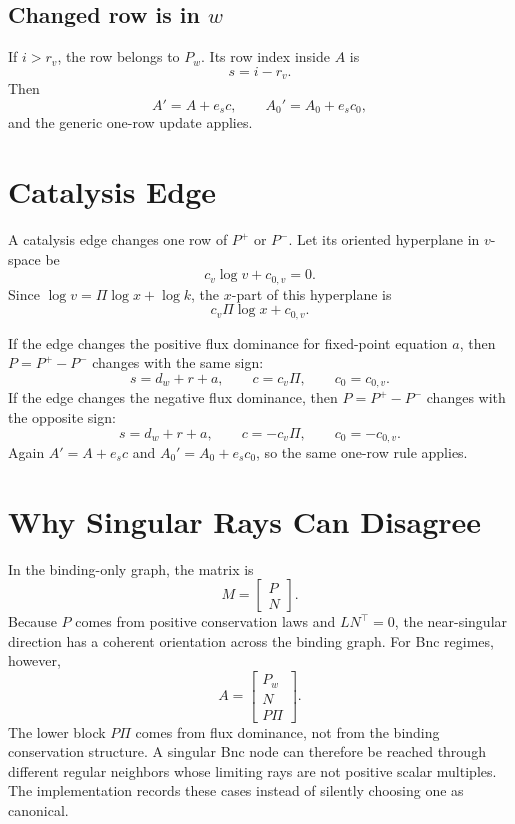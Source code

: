 \documentclass[11pt]{article}
\newcommand{\logx}{\log x}
\newcommand{\logv}{\log v}
\newcommand{\logk}{\log k}
\begin{document}
\subsection*{Changed row is in \(w\)}

If \(i>r_v\), the row belongs to \(P_w\).  Its row index inside \(A\) is
\[
    s=i-r_v .
\]
Then
\[
    A'=A+e_s c,
    \qquad
    A_0'=A_0+e_sc_0,
\]
and the generic one-row update applies.

\section{Catalysis Edge}

A catalysis edge changes one row of \(P^+\) or \(P^-\).  Let its oriented
hyperplane in \(v\)-space be
\[
    c_v\logv+c_{0,v}=0.
\]
Since \(\logv=\Pi\logx+\logk\), the \(x\)-part of this hyperplane is
\[
    c_v\Pi\logx+c_{0,v}.
\]

If the edge changes the positive flux dominance for fixed-point equation \(a\),
then \(P=P^+-P^-\) changes with the same sign:
\[
    s=d_w+r+a,
    \qquad
    c=c_v\Pi,
    \qquad
    c_0=c_{0,v}.
\]
If the edge changes the negative flux dominance, then \(P=P^+-P^-\) changes with
the opposite sign:
\[
    s=d_w+r+a,
    \qquad
    c=-c_v\Pi,
    \qquad
    c_0=-c_{0,v}.
\]
Again \(A'=A+e_sc\) and \(A_0'=A_0+e_sc_0\), so the same one-row rule applies.

\section{Why Singular Rays Can Disagree}

In the binding-only graph, the matrix is
\[
    M=\begin{bmatrix}P\\N\end{bmatrix}.
\]
Because \(P\) comes from positive conservation laws and \(LN^\top=0\), the
near-singular direction has a coherent orientation across the binding graph.
For Bnc regimes, however,
\[
    A=\begin{bmatrix}P_w\\N\\P\Pi\end{bmatrix}.
\]
The lower block \(P\Pi\) comes from flux dominance, not from the binding
conservation structure.  A singular Bnc node can therefore be reached through
different regular neighbors whose limiting rays are not positive scalar
multiples.  The implementation records these cases instead of silently choosing
one as canonical.
\end{document}
